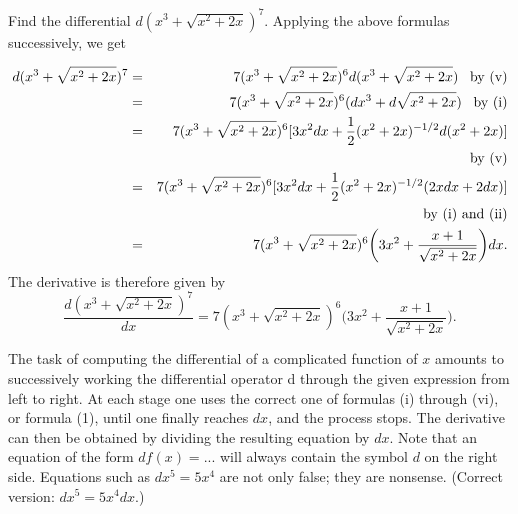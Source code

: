 \begin{example}
Find the differential $d(x^3 + \sqrt{x^2 + 2x})^7$. Applying the above formulas successively, we get

\begin{eqnarray*}
d(x^3 + \sqrt{x^2 + 2x})^7
&=& 7(x^3 + \sqrt{x^2 + 2x})^6 d(x^3 + \sqrt{x^2 + 2x})  \;\;\;\mbox{by (v)}\\
&=& 7(x^3 + \sqrt{x^2 + 2x})^6 (dx^3 + d\sqrt{x^2 + 2x}) \;\;\;\mbox{by (i)}\\
&=& 7(x^3 + \sqrt{x^2 + 2x})^6 [3x^2 dx + \frac{1}{2}(x^2 + 2x)^{-1/2} d(x^2 + 2x)] \\
& & \hspace{2.5in} \mbox{by (v)}\\
&=& 7(x^3 + \sqrt{x^2 + 2x})^6 [3x^2 dx + \frac{1}{2}(x^2 + 2x)^{-1/2} (2x dx + 2 dx)] \\ 
& &\hspace{2in} \mbox{by (i) and (ii)} \\ 
&=& 7(x^3 + \sqrt{x^2 + 2x})^6 \biggl( 3x^2 +\frac{x+1}{\sqrt{x^2 +
2x}}\biggr) dx.
\end{eqnarray*}
\noindent The derivative is therefore given by
$$
\frac{d(x^3 + \sqrt{x^2 + 2x})^7}{dx} = 7(x^3 + \sqrt{x^2 + 2x})^6 \biggl(3x^2 + \frac{x +
1}{\sqrt{x^2 + 2x}}\biggr).
$$
\end{example}

The task of computing the differential of a complicated function of $x$ amounts to successively working the differential operator d through the given expression from left to right. At each stage one uses the correct one of formulas (i) through (vi), or formula (1), until one finally reaches $dx$, and the process stops. The derivative can then be obtained by dividing the resulting equation by $dx$. Note that an equation of the form $df(x) = ...$ will always contain the symbol $d$ on the right side. Equations such as $dx^5 = 5x^4$ are not only false; they are nonsense. (Correct version: $dx^5 = 5x^4 dx$.)

